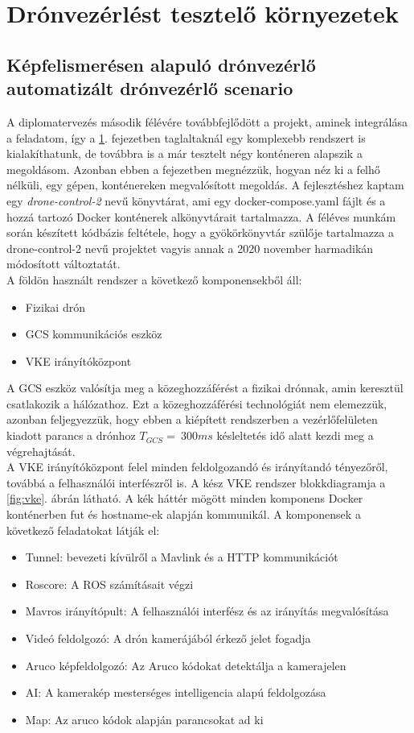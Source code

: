 \chapter{Drónvezérlést tesztelő környezetek}
\label{chap:vmtest}

\section{Képfelismerésen alapuló drónvezérlő automatizált drónvezérlő scenario}
\label{cha:fizikai}
A diplomatervezés második félévére továbbfejlődött a projekt, aminek integrálása a feladatom, így a \ref{chap:vmtest}. fejezetben taglaltaknál egy komplexebb rendszert is kialakíthatunk, de továbbra is a már tesztelt négy konténeren alapszik a megoldásom. Azonban ebben a fejezetben megnézzük, hogyan néz ki a felhő nélküli, egy gépen, konténereken megvalósított megoldás. A fejlesztéshez kaptam egy \emph{drone-control-2} nevű könyvtárat, ami egy docker-compose.yaml fájlt és a hozzá tartozó Docker konténerek alkönyvtárait tartalmazza. A féléves munkám során készített kódbázis feltétele, hogy a gyökörkönyvtár szülője tartalmazza a drone-control-2 nevű projektet vagyis annak a 2020 november harmadikán módosított változtatát. \\

\noindent
A földön használt rendszer a következő komponensekből áll:
\begin{itemize}
	\item Fizikai drón
	\item GCS kommunikációs eszköz
	\item VKE irányítóközpont
\end{itemize}

\noindent
A GCS eszköz valósítja meg a közeghozzáférést a fizikai drónnak, amin keresztül csatlakozik a hálózathoz. Ezt a közeghozzáférési technológiát nem elemezzük, azonban feljegyezzük, hogy ebben a kiépített rendszerben a vezérlőfelületen kiadott parancs a drónhoz $T_{GCS} = ~300 ms$ késleltetés idő alatt kezdi meg a végrehajtását. \\

\noindent
A VKE irányítóközpont felel minden feldolgozandó és irányítandó tényezőről, továbbá a felhasználói interfészről is. A kész VKE rendszer blokkdiagramja a \ref{fig:vke}. ábrán látható. A kék háttér mögött minden komponens Docker konténerben fut és hostname-ek alapján kommunikál. A komponensek a következő feladatokat látják el:
\begin{itemize}
	\item Tunnel: bevezeti kívülről a Mavlink és a HTTP kommunikációt
	\item Roscore: A ROS számításait végzi
	\item Mavros irányítópult: A felhasználói interfész és az irányítás megvalósítása
	\item Videó feldolgozó: A drón kamerájából érkező jelet fogadja
	\item Aruco képfeldolgozó: Az Aruco kódokat detektálja a kamerajelen
	\item AI: A kamerakép mesterséges intelligencia alapú feldolgozása
	\item Map: Az aruco kódok alapján parancsokat ad ki
\end{itemize}


